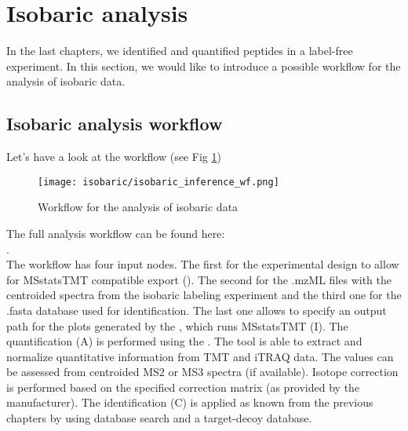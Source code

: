 

\newpage
\section{Isobaric analysis}
In the last chapters, we identified and quantified peptides in a label-free experiment. In this section, we would like to introduce a possible workflow for the analysis of isobaric data.

\subsection{Isobaric analysis workflow}
Let's have a look at the workflow (see Fig \ref{fig:isobaric_wf})

\begin{figure}[htbp]
  \centering
  \texttt{[image: isobaric/isobaric\_inference\_wf.png]}
  \caption{Workflow for the analysis of isobaric data}
  \label{fig:isobaric_wf}
\end{figure}

\noindent The full analysis workflow can be found here: \\
. \\

\noindent The workflow has four input nodes. The first for the experimental design to allow for MSstatsTMT compatible export (). The second for the .mzML files with the centroided spectra from the isobaric labeling experiment and the third one for the .fasta database used for identification. The last one allows to specify an output path for the plots generated by the , which runs MSstatsTMT (I). The quantification (A) is performed using the . The tool is able to extract and normalize quantitative information from TMT and iTRAQ data. The values can be assessed from centroided MS2 or MS3 spectra (if available). Isotope correction is performed based on the specified correction matrix (as provided by the manufacturer). The identification (C) is applied as known from the previous chapters by using database search and a target-decoy database.

